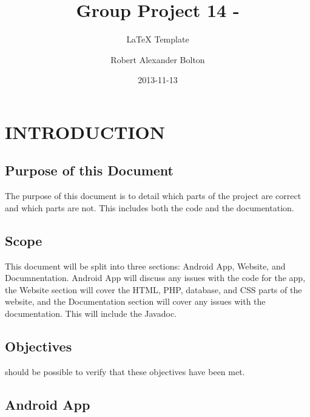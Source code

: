 \documentclass{project}
\begin{document}
\title{Group Project 14 -}

\subtitle{LaTeX Template}
\author{Robert Alexander Bolton}     
\date{2013-11-13}

\maketitle
\tableofcontents
\newpage


\section{INTRODUCTION}

\subsection{Purpose of this Document}
The purpose of this document is to detail which parts of the project are correct
and which parts are not. This includes both the code and the documentation. \cite{se.qa.03}

\subsection{Scope}
This document will be split into three sections: Android App, Website, and Documnentation.
Android App will discuss any issues with the code for the app, the Website section will cover the HTML, PHP, database, and CSS parts of the website, and the Documentation section will cover any issues with the documentation. This will include the Javadoc. \cite{se.qa.03}

\subsection{Objectives}
%
%
%
%
should be possible to verify that these objectives have been met. \cite{se.qa.03}


\subsection{Android App}
\end{document}
